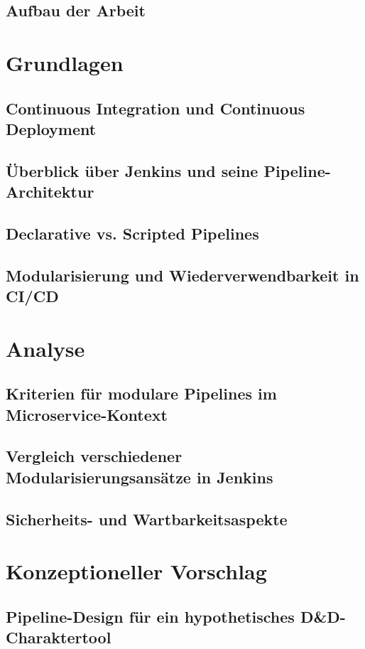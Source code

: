 \documentclass[conference,compsoc,final,a4paper]{IEEEtran}
\begin{document}
\subsection{Aufbau der Arbeit}

\section{Grundlagen}
\subsection{Continuous Integration und Continuous Deployment}
\subsection{Überblick über Jenkins und seine Pipeline-Architektur}
\subsection{Declarative vs. Scripted Pipelines}
\subsection{Modularisierung und Wiederverwendbarkeit in CI/CD}

\section{Analyse}
\subsection{Kriterien für modulare Pipelines im Microservice-Kontext}
\subsection{Vergleich verschiedener Modularisierungsansätze in Jenkins}
\subsection{Sicherheits- und Wartbarkeitsaspekte}

\section{Konzeptioneller Vorschlag}
\subsection{Pipeline-Design für ein hypothetisches D\&D-Charaktertool}
\end{document}
